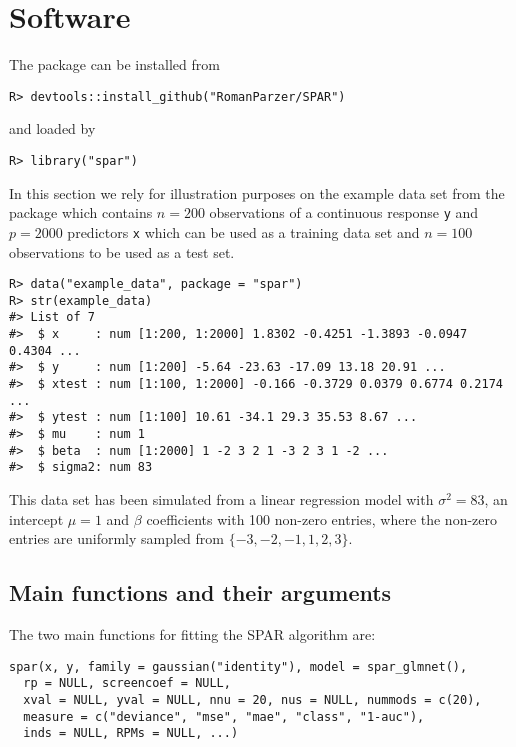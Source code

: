 \documentclass[
  article]{jss}
\begin{document}
\section{Software}\label{sec-software}

The package can be installed from 

\begin{verbatim}
R> devtools::install_github("RomanParzer/SPAR")
\end{verbatim}

and loaded by

\begin{verbatim}
R> library("spar")
\end{verbatim}

In this section we rely for illustration purposes on the example data
set from the package which contains \(n=200\) observations of a
continuous response \texttt{y} and \(p=2000\) predictors \texttt{x}
which can be used as a training data set and \(n=100\) observations to
be used as a test set.

\begin{verbatim}
R> data("example_data", package = "spar")
R> str(example_data)
#> List of 7
#>  $ x     : num [1:200, 1:2000] 1.8302 -0.4251 -1.3893 -0.0947 0.4304 ...
#>  $ y     : num [1:200] -5.64 -23.63 -17.09 13.18 20.91 ...
#>  $ xtest : num [1:100, 1:2000] -0.166 -0.3729 0.0379 0.6774 0.2174 ...
#>  $ ytest : num [1:100] 10.61 -34.1 29.3 35.53 8.67 ...
#>  $ mu    : num 1
#>  $ beta  : num [1:2000] 1 -2 3 2 1 -3 2 3 1 -2 ...
#>  $ sigma2: num 83
\end{verbatim}

This data set has been simulated from a linear regression model with
\(\sigma^2=83\), an intercept \(\mu=1\) and \(\beta\) coefficients with
100 non-zero entries, where the non-zero entries are uniformly sampled
from \(\{-3,-2,-1,1,2,3\}\).

\subsection{Main functions and their
arguments}\label{main-functions-and-their-arguments}

The two main functions for fitting the SPAR algorithm are:

\begin{verbatim}
spar(x, y, family = gaussian("identity"), model = spar_glmnet(), 
  rp = NULL, screencoef = NULL,
  xval = NULL, yval = NULL, nnu = 20, nus = NULL, nummods = c(20),
  measure = c("deviance", "mse", "mae", "class", "1-auc"),
  inds = NULL, RPMs = NULL, ...)
\end{verbatim}
\end{document}
